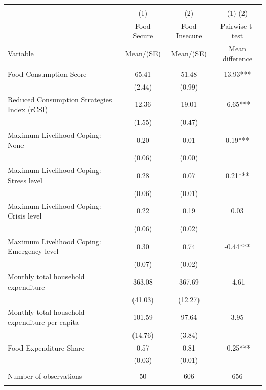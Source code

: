 
\begin{tabular}{@{\extracolsep{5pt}}lccc}
\\[-1.8ex]\hline \hline \\[-1.8ex]
 & \multicolumn{1}{c}{(1)}  & \multicolumn{1}{c}{(2)}  & \multicolumn{1}{c}{(1)-(2)} \\
 & \multicolumn{1}{c}{Food Secure}  & \multicolumn{1}{c}{Food Insecure}  & \multicolumn{1}{c}{Pairwise t-test}  \\
Variable & Mean/(SE) & Mean/(SE) & Mean difference \\ \hline \\[-1.8ex] 
Food Consumption Score   & 65.41    & 51.48    & 13.93***   \\
 & (2.44)  & (0.99)  &  \\ [1ex]
Reduced Consumption Strategies Index (rCSI)   & 12.36    & 19.01    & -6.65***   \\
 & (1.55)  & (0.47)  &  \\ [1ex]
Maximum Livelihood Coping: None   & 0.20    & 0.01    & 0.19***   \\
 & (0.06)  & (0.00)  &  \\ [1ex]
Maximum Livelihood Coping: Stress level   & 0.28    & 0.07    & 0.21***   \\
 & (0.06)  & (0.01)  &  \\ [1ex]
Maximum Livelihood Coping: Crisis level   & 0.22    & 0.19    & 0.03   \\
 & (0.06)  & (0.02)  &  \\ [1ex]
Maximum Livelihood Coping: Emergency level   & 0.30    & 0.74    & -0.44***   \\
 & (0.07)  & (0.02)  &  \\ [1ex]
Monthly total household expenditure   & 363.08    & 367.69    & -4.61   \\
 & (41.03)  & (12.27)  &  \\ [1ex]
Monthly total household expenditure per capita   & 101.59    & 97.64    & 3.95   \\
 & (14.76)  & (3.84)  &  \\ [1ex]
Food Expenditure Share   & 0.57    & 0.81    & -0.25***   \\
 & (0.03)  & (0.01)  &  \\ [1ex]
\hline \\[-1.8ex]
Number of observations  & 50   & 606  & 656  \\
\hline \hline \\[-1.8ex]

\end{tabular}
